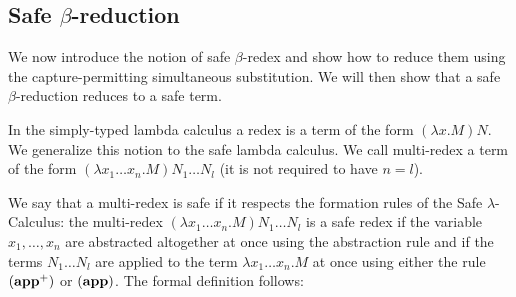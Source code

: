 \subsection{Safe $\beta$-reduction}

We now introduce the notion of safe $\beta$-redex and show how to
reduce them using the capture-permitting simultaneous substitution.
We will then show that a safe $\beta$-reduction reduces to a safe
term.


In the simply-typed lambda calculus a redex is a term of the form $(\lambda x . M) N$.
We generalize this notion to the safe lambda calculus. We call multi-redex a term of the form
$(\lambda x_1 \ldots x_n . M) N_1 \ldots N_l$ (it is not required to have $n=l$).


We say that a multi-redex is safe if it respects the formation rules
of the Safe $\lambda$-Calculus: the multi-redex $(\lambda x_1 \ldots
x_n . M) N_1 \ldots N_l$ is a safe redex if the variable
$x_1,\ldots,x_n$ are abstracted altogether at once using the
abstraction rule and if the terms $N_1 \ldots N_l$ are applied to
the term $\lambda x_1 \ldots x_n . M$ at once using either the rule
$\mathbf{(app^+)}$ or $\mathbf{(app)}$. The formal definition
follows:

